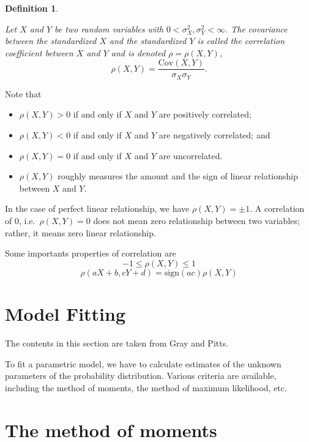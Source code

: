 \documentclass[landscape, 20pt]{extreport}
\theoremstyle{definition}
\newtheorem{definition}{Definition}[chapter]
\theoremstyle{definition}
\theoremstyle{definition}
\theoremstyle{definition}
\theoremstyle{remark}
\begin{document}
\begin{definition}
\protect\hypertarget{def:unlabeled-div-27}{}\label{def:unlabeled-div-27}

\emph{Let \(X\) and \(Y\) be two random variables with
\(0< \sigma^2_X, \sigma^2_Y < \infty\). The covariance between the
standardized \(X\) and the standardized \(Y\) is called the correlation
coefficient between \(X\) and \(Y\) and is denoted \(\rho = \rho(X,Y)\),
\[\rho(X,Y) = \frac{\mathrm{Cov}(X,Y)}{\sigma_X \sigma_Y}.\] }

\end{definition}

Note that

\begin{itemize}
\item
  \(\rho(X, Y ) > 0\) if and only if \(X\) and \(Y\) are positively
  correlated;
\item
  \(\rho(X, Y ) < 0\) if and only if \(X\) and \(Y\) are negatively
  correlated; and
\item
  \(\rho(X, Y ) = 0\) if and only if \(X\) and \(Y\) are uncorrelated.
\item
  \(\rho(X, Y )\) roughly measures the amount and the sign of linear
  relationship between \(X\) and \(Y\).
\end{itemize}

In the case of perfect linear relationship, we have
\(\rho(X, Y ) = \pm1\). A correlation of 0, i.e.~\(\rho(X, Y ) = 0\) does
not mean zero relationship between two variables; rather, it means zero
linear relationship.

Some importants properties of correlation are
\[-1 \le \rho(X, Y ) \le 1\]
\[\rho(a X + b, cY +d) = \text{sign}(ac) \rho(X, Y )\]

\hypertarget{model-fitting}{%
\section{Model Fitting}\label{model-fitting}}

The contents in this section are taken from Gray and Pitts.

To fit a parametric model, we have to calculate estimates of the unknown
parameters of the probability distribution. Various criteria are
available, including the method of moments, the method of maximum
likelihood, etc.

\hypertarget{the-method-of-moments}{%
\section{The method of moments}\label{the-method-of-moments}}
\end{document}
